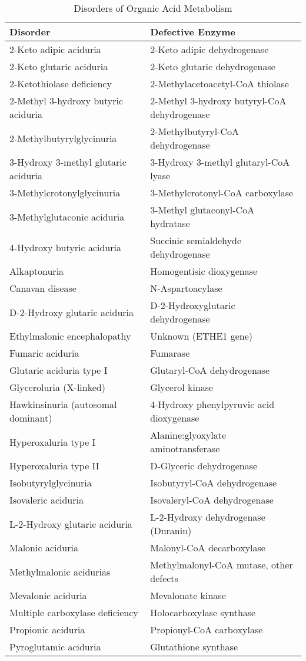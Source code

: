 \documentclass[12pt]{scrartcl}
\begin{document}
\begin{table}[htbp]
\caption{\label{tab:orgcf57bfb}Disorders of Organic Acid Metabolism}
\centering
\begin{tabular}{ll}
Disorder & Defective Enzyme\\
\hline
2-Keto adipic aciduria & 2-Keto adipic dehydrogenase\\
2-Keto glutaric aciduria & 2-Keto glutaric dehydrogenase\\
2-Ketothiolase deficiency & 2-Methylacetoacetyl-CoA thiolase\\
2-Methyl 3-hydroxy butyric aciduria & 2-Methyl 3-hydroxy butyryl-CoA dehydrogenase\\
2-Methylbutyrylglycinuria & 2-Methylbutyryl-CoA dehydrogenase\\
3-Hydroxy 3-methyl glutaric aciduria & 3-Hydroxy 3-methyl glutaryl-CoA lyase\\
3-Methylcrotonylglycinuria & 3-Methylcrotonyl-CoA carboxylase\\
3-Methylglutaconic aciduria & 3-Methyl glutaconyl-CoA hydratase\\
4-Hydroxy butyric aciduria & Succinic semialdehyde dehydrogenase\\
Alkaptonuria & Homogentisic dioxygenase\\
Canavan disease & N-Aspartoacylase\\
D-2-Hydroxy glutaric aciduria & D-2-Hydroxyglutaric dehydrogenase\\
Ethylmalonic encephalopathy & Unknown (ETHE1 gene)\\
Fumaric aciduria & Fumarase\\
Glutaric aciduria type I & Glutaryl-CoA dehydrogenase\\
Glyceroluria (X-linked) & Glycerol kinase\\
Hawkinsinuria (autosomal dominant) & 4-Hydroxy phenylpyruvic acid dioxygenase\\
Hyperoxaluria type I & Alanine:glyoxylate aminotransferase\\
Hyperoxaluria type II & D-Glyceric dehydrogenase\\
Isobutyrylglycinuria & Isobutyryl-CoA dehydrogenase\\
Isovaleric aciduria & Isovaleryl-CoA dehydrogenase\\
L-2-Hydroxy glutaric aciduria & L-2-Hydroxy dehydrogenase (Duranin)\\
Malonic aciduria & Malonyl-CoA decarboxylase\\
Methylmalonic acidurias & Methylmalonyl-CoA mutase, other defects\\
Mevalonic aciduria & Mevalonate kinase\\
Multiple carboxylase deficiency & Holocarboxylase synthase\\
Propionic aciduria & Propionyl-CoA carboxylase\\
Pyroglutamic aciduria & Glutathione synthase\\
\end{tabular}
\end{table}
\end{document}
